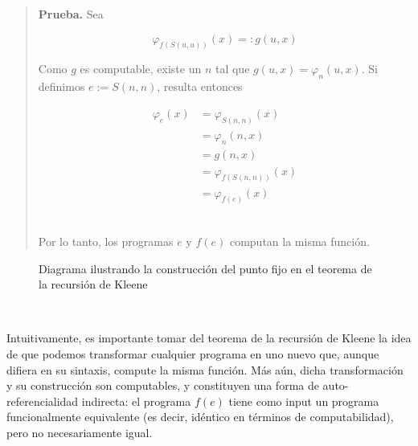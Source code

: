\documentclass[a4paper, 12pt]{article}
\begin{document}
\small
\begin{quote}

\textbf{Prueba.} Sea 

$$\varphi_{f(S(u, u))}(x) =: g(u, x)$$ 


Como $g$ es computable, existe un $n$ tal que $g(u, x) = \varphi_n(u, x)$. Si
definimos $e := S(n, n)$, resulta entonces

\begin{align*}
  \varphi_e(x) 
  &=\varphi_{S(n, n)}(x) \\ 
  &=\varphi_n(n, x) \\ 
  &=g(n, x) \\ 
  &=\varphi_{f(S(n, n))}(x) \\ 
  &=\varphi_{f(e)}(x)
\end{align*}
~

Por lo tanto, los programas $e$ y $f(e)$ computan la misma función. 

\end{quote}
\normalsize


\begin{figure}[ht]
  \centering
  \caption{Diagrama ilustrando la construcción del punto fijo en el teorema de
  la recursión de Kleene}
  \label{fig:kleene-recursion}
\end{figure}

~

Intuitivamente, es importante tomar del teorema de la recursión de
Kleene la idea de que podemos transformar cualquier programa en uno nuevo que,
aunque difiera en su sintaxis, compute la misma función. Más aún, dicha
transformación y su construcción son computables, y constituyen una forma de
auto-referencialidad indirecta: el programa $f(e)$ tiene como input un programa
funcionalmente equivalente (es decir, idéntico en términos de computabilidad),
pero no necesariamente igual.
\end{document}

